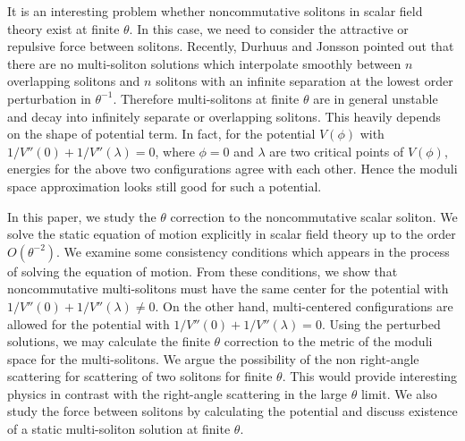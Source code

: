 \documentclass[a4paper,12pt]{article}
\begin{document}
It is an interesting problem whether noncommutative solitons in scalar field
theory exist at finite $\theta$.
In this case, we need to consider the attractive or repulsive force
between solitons.
Recently, Durhuus and Jonsson pointed out that there are no
multi-soliton solutions which interpolate smoothly between $n$
overlapping solitons and $n$ solitons with an infinite separation
at the lowest order perturbation in $\theta^{-1}$\cite{DJ}.
Therefore multi-solitons at finite $\theta$ are in general unstable and
decay into infinitely separate or overlapping solitons.
This  heavily depends on the shape of potential term.
In fact, for the potential $V(\phi)$ with
$1/V''(0)+1/V''(\lambda)=0$, where $\phi=0$ and $\lambda$ are two critical
points of $V(\phi)$, energies for the above two configurations agree
with each other.
Hence the moduli space approximation looks still good for such a
potential.

In this paper,
we study the $\theta$ correction to the noncommutative scalar soliton.
We solve the static
equation
of motion explicitly in scalar field theory
up to the order
 $O(\theta^{-2})$.
We examine some consistency conditions
which appears in the process of solving the equation of motion.
{}From these conditions,
we show
that  noncommutative multi-solitons must have the
same center for the potential with $1/V''(0)+1/V''(\lambda)\neq 0$.
On the other hand, multi-centered
configurations are allowed for the  potential with
$1/V''(0)+1/V''(\lambda)= 0$.
Using the perturbed solutions, we may calculate the finite
$\theta$ correction
to the metric of the moduli
space for the  multi-solitons.
We argue the possibility of the
non right-angle scattering for scattering of two solitons for finite
$\theta$. This would provide interesting physics  in contrast
with the right-angle scattering in the large $\theta$ limit.
We also study the force between solitons by calculating the potential
and discuss existence of a static multi-soliton solution
at finite $\theta$.
\end{document}

